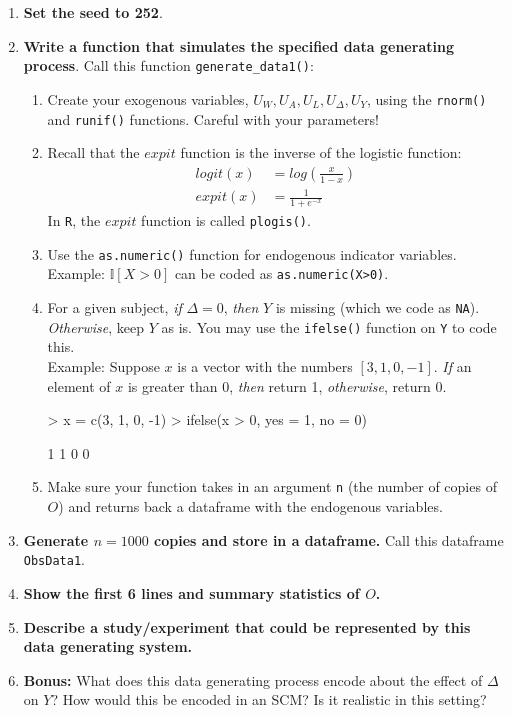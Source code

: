 \documentclass{exam}
\begin{document}
\begin{enumerate}
\item \textbf{Set the seed to 252}.
\item \textbf{Write a function that simulates the specified data generating process}. Call this function \texttt{generate\_data1()}:
\begin{enumerate}
\item Create your exogenous variables, $U_W, U_A, U_L, U_\Delta, U_Y$, using the \texttt{rnorm()} and \texttt{runif()} functions. Careful with your parameters!
\item Recall that the $expit$ function is the inverse of the logistic function:
\begin{align*}
logit(x) &= log\left(\frac{x}{1-x} \right)\\
expit(x) &=\frac{1}{1+e^{-x}}
 \end{align*}
In \texttt{R}, the $expit$ function is called \texttt{plogis()}.
\item Use the \texttt{as.numeric()} function for endogenous indicator variables. \\
Example: $\mathbb{I}[X > 0]$ can be coded as \texttt{as.numeric(X>0)}.
\item For a given subject, \textit{if} $\Delta = 0$, \textit{then} $Y$ is missing (which we code as \texttt{NA}). \textit{Otherwise}, keep $Y$ as is. You may use the \texttt{ifelse()} function on \texttt{Y} to code this. \\
Example: Suppose $x$ is a vector with the numbers $[3, 1, 0, -1]$. \textit{If} an element of $x$ is greater than 0, \textit{then} return 1, \textit{otherwise}, return 0.
\begin{Schunk}
\begin{Sinput}
> x = c(3, 1, 0, -1)
> ifelse(x > 0, yes = 1, no = 0)
\end{Sinput}
\begin{Soutput}
[1] 1 1 0 0
\end{Soutput}
\end{Schunk}
\item Make sure your function takes in an argument \texttt{n} (the number of copies of $O$) and returns back a dataframe with the endogenous variables.
\end{enumerate}
\item \textbf{Generate $n=1000$ copies and store in a dataframe.} Call this dataframe \texttt{ObsData1}.
\item \textbf{Show the first 6 lines and summary statistics of $O$.}
\item \textbf{Describe a study/experiment that could be represented by this data generating system.}
\item \textbf{Bonus:} What does this data generating process encode about the effect of $\Delta$ on $Y$? How would this be encoded in an SCM? Is it realistic in this setting?
\end{enumerate}
\end{document}
